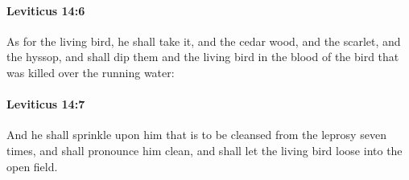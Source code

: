		\paragraph{Leviticus 14:6} %
			\label{LEVITICUS-14-6}

			As for the living bird, he shall take it, and the cedar wood, and the scarlet, and the hyssop, and shall dip them and the living bird in the blood of the bird that was killed over the running water:


		\paragraph{Leviticus 14:7} %
			\label{LEVITICUS-14-7}

			And he shall sprinkle upon him that is to be cleansed from the leprosy seven times, and shall pronounce him clean, and shall let the living bird loose into the open field.

